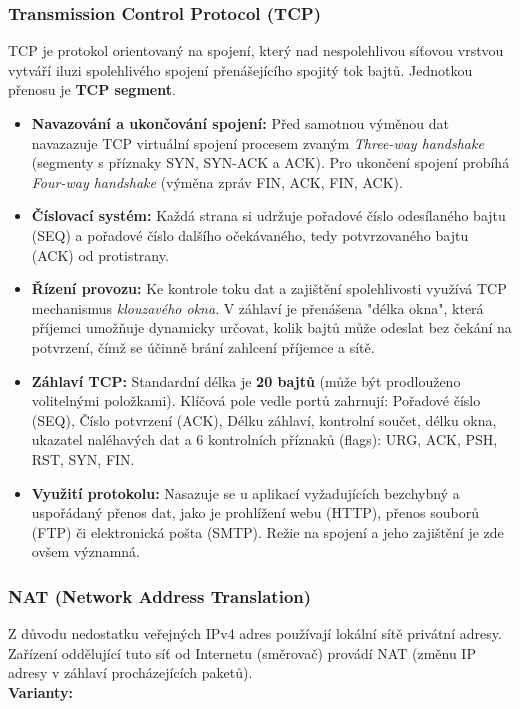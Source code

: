     \subsubsection{Transmission Control Protocol (TCP)}
        TCP je protokol orientovaný na spojení, který nad nespolehlivou síťovou vrstvou vytváří iluzi spolehlivého spojení přenášejícího spojitý tok bajtů. Jednotkou přenosu je \textbf{TCP segment}.
        \begin{itemize}
            \item \textbf{Navazování a ukončování spojení:} Před samotnou výměnou dat navazazuje TCP virtuální spojení procesem zvaným \textit{Three-way handshake} (segmenty s příznaky SYN, SYN-ACK a ACK). Pro ukončení spojení probíhá \textit{Four-way handshake} (výměna zpráv FIN, ACK, FIN, ACK).
            \item \textbf{Číslovací systém:}  Každá strana si udržuje pořadové číslo odesílaného bajtu (SEQ) a pořadové číslo dalšího očekávaného, tedy potvrzovaného bajtu (ACK) od protistrany.
            \item \textbf{Řízení provozu:} Ke kontrole toku dat a zajištění spolehlivosti využívá TCP mechanismus \textit{klouzavého okna}. V záhlaví je přenášena "délka okna", která příjemci umožňuje dynamicky určovat, kolik bajtů může odeslat bez čekání na potvrzení, čímž se účinně brání zahlcení příjemce a sítě.
            \item \textbf{Záhlaví TCP:} Standardní délka je \textbf{20 bajtů} (může být prodlouženo volitelnými položkami). Klíčová pole vedle portů zahrnují: Pořadové číslo (SEQ), Číslo potvrzení (ACK), Délku záhlaví, kontrolní součet, délku okna, ukazatel naléhavých dat a 6 kontrolních příznaků (flags): URG, ACK, PSH, RST, SYN, FIN.
            \item \textbf{Využití protokolu:} Nasazuje se u aplikací vyžadujících bezchybný a uspořádaný přenos dat, jako je prohlížení webu (HTTP), přenos souborů (FTP) či elektronická pošta (SMTP). Režie na spojení a jeho zajištění je zde ovšem významná.
        \end{itemize}
    \subsubsection{NAT (Network Address Translation)}
        Z důvodu nedostatku veřejných IPv4 adres používají lokální sítě privátní adresy. Zařízení oddělující tuto síť od Internetu (směrovač) provádí NAT (změnu IP adresy v záhlaví procházejících paketů).
        \\
        \textbf{Varianty:}
        
